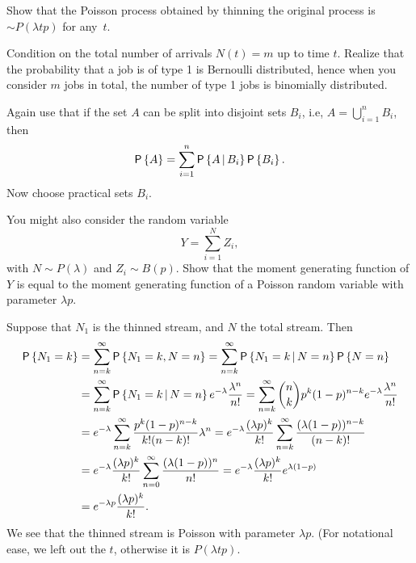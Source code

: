 \begin{question}
Show that the Poisson process obtained by thinning the original
  process is $\sim P(\lambda t p)$ for any~$t$.

  \begin{hint}
 Condition on the total number of arrivals $N(t)=m$ up to time
      $t$. Realize that the probability that a job is of type 1 is
      Bernoulli distributed, hence when you consider $m$ jobs in
      total, the number of type 1 jobs is binomially distributed.

      Again use that if the set $A$ can be split into disjoint sets
      $B_i$, i.e, $A=\bigcup_{i=1}^n B_i$, then
    \begin{equation*}
      \P{A} = \sum_{i=1}^n \P{A\given B_i} \P{B_i}.
    \end{equation*}
Now choose practical sets $B_i$. 


You might also consider the random variable 
  \begin{equation*}
    Y = \sum_{i=1}^N Z_i,
  \end{equation*}
  with $N\sim P(\lambda)$ and $Z_i\sim B(p)$. Show that the moment
  generating function of $Y$ is equal to the moment generating
  function of a Poisson random variable with parameter $\lambda p$.
  \end{hint}

    \begin{solution}
Suppose that  $N_1$ is the  thinned stream, and $N$ the total stream. Then
\begin{equation*}
  \begin{split}
    \P{N_1 = k}
&= \sum_{n=k}^\infty \P{N_1 =k, N = n} 
= \sum_{n=k}^\infty \P{N_1 =k\given N = n}\P{N=n} \\
&= \sum_{n=k}^\infty \P{N_1 =k\given N = n}e^{-\lambda} \frac{\lambda^n}{n!}
= \sum_{n=k}^\infty {n \choose k} p^k (1-p)^{n-k} e^{-\lambda} \frac{\lambda^n}{n!}\\
&= e^{-\lambda}\sum_{n=k}^\infty  \frac{p^k (1-p)^{n-k}}{k! (n-k)!} \lambda^n
= e^{-\lambda} \frac{(\lambda p)^k}{k!} \sum_{n=k}^\infty  \frac{(\lambda (1-p))^{n-k}}{(n-k)!}\\
&= e^{-\lambda} \frac{(\lambda p)^k}{k!} \sum_{n=0}^\infty  \frac{(\lambda (1-p))^{n}}{n!}
= e^{-\lambda} \frac{(\lambda p)^k}{k!} e^{\lambda(1-p)} \\
&= e^{-\lambda p} \frac{(\lambda p)^k}{k!}.
  \end{split}
\end{equation*}
We see that the thinned stream is Poisson with parameter $\lambda p$. (For notational ease, we left out the $t$, otherwise it is $P(\lambda t p)$. 


\end{solution}
\end{question}
